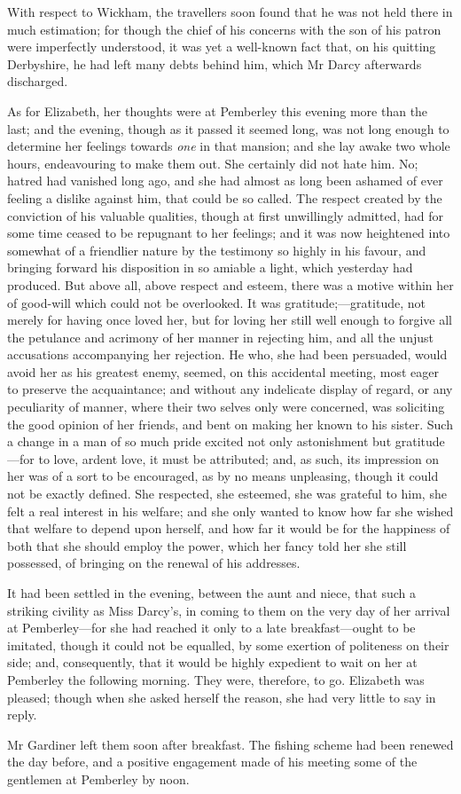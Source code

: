 With respect to Wickham, the travellers soon found that he was not held there in much estimation; for though the chief of his concerns with the son of his patron were imperfectly understood, it was yet a well-known fact that, on his quitting Derbyshire, he had left many debts behind him, which Mr Darcy afterwards discharged.

As for Elizabeth, her thoughts were at Pemberley this evening more than the last; and the evening, though as it passed it seemed long, was not long enough to determine her feelings towards \textit{one} in that mansion; and she lay awake two whole hours, endeavouring to make them out. She certainly did not hate him. No; hatred had vanished long ago, and she had almost as long been ashamed of ever feeling a dislike against him, that could be so called. The respect created by the conviction of his valuable qualities, though at first unwillingly admitted, had for some time ceased to be repugnant to her feelings; and it was now heightened into somewhat of a friendlier nature by the testimony so highly in his favour, and bringing forward his disposition in so amiable a light, which yesterday had produced. But above all, above respect and esteem, there was a motive within her of good-will which could not be overlooked. It was gratitude;—gratitude, not merely for having once loved her, but for loving her still well enough to forgive all the petulance and acrimony of her manner in rejecting him, and all the unjust accusations accompanying her rejection. He who, she had been persuaded, would avoid her as his greatest enemy, seemed, on this accidental meeting, most eager to preserve the acquaintance; and without any indelicate display of regard, or any peculiarity of manner, where their two selves only were concerned, was soliciting the good opinion of her friends, and bent on making her known to his sister. Such a change in a man of so much pride excited not only astonishment but gratitude—for to love, ardent love, it must be attributed; and, as such, its impression on her was of a sort to be encouraged, as by no means unpleasing, though it could not be exactly defined. She respected, she esteemed, she was grateful to him, she felt a real interest in his welfare; and she only wanted to know how far she wished that welfare to depend upon herself, and how far it would be for the happiness of both that she should employ the power, which her fancy told her she still possessed, of bringing on the renewal of his addresses.

It had been settled in the evening, between the aunt and niece, that such a striking civility as Miss Darcy's, in coming to them on the very day of her arrival at Pemberley—for she had reached it only to a late breakfast—ought to be imitated, though it could not be equalled, by some exertion of politeness on their side; and, consequently, that it would be highly expedient to wait on her at Pemberley the following morning. They were, therefore, to go. Elizabeth was pleased; though when she asked herself the reason, she had very little to say in reply.

Mr Gardiner left them soon after breakfast. The fishing scheme had been renewed the day before, and a positive engagement made of his meeting some of the gentlemen at Pemberley by noon.